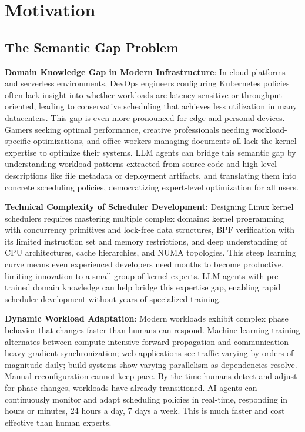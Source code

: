 \section{Motivation}
\label{sec:motivation}

\subsection{The Semantic Gap Problem}

\textbf{Domain Knowledge Gap in Modern Infrastructure}: In cloud platforms and serverless environments, DevOps engineers configuring Kubernetes policies often lack insight into whether workloads are latency-sensitive or throughput-oriented, leading to conservative scheduling that achieves less utilization in many datacenters. This gap is even more pronounced for edge and personal devices. Gamers seeking optimal performance, creative professionals needing workload-specific optimizations, and office workers managing documents all lack the kernel expertise to optimize their systems. LLM agents can bridge this semantic gap by understanding workload patterns extracted from source code and high-level descriptions like file metadata or deployment artifacts, and translating them into concrete scheduling policies, democratizing expert-level optimization for all users.

\textbf{Technical Complexity of Scheduler Development}: Designing Linux kernel schedulers requires mastering multiple complex domains: kernel programming with concurrency primitives and lock-free data structures, BPF verification with its limited instruction set and memory restrictions, and deep understanding of CPU architectures, cache hierarchies, and NUMA topologies. This steep learning curve means even experienced developers need months to become productive, limiting innovation to a small group of kernel experts. LLM agents with pre-trained domain knowledge can help bridge this expertise gap, enabling rapid scheduler development without years of specialized training.

\textbf{Dynamic Workload Adaptation}: Modern workloads exhibit complex phase behavior that changes faster than humans can respond. Machine learning training alternates between compute-intensive forward propagation and communication-heavy gradient synchronization; web applications see traffic varying by orders of magnitude daily; build systems show varying parallelism as dependencies resolve. Manual reconfiguration cannot keep pace. By the time humans detect and adjust for phase changes, workloads have already transitioned. AI agents can continuously monitor and adapt scheduling policies in real-time, responding in hours or minutes, 24 hours a day, 7 days a week. This is much faster and cost effective than human experts.

